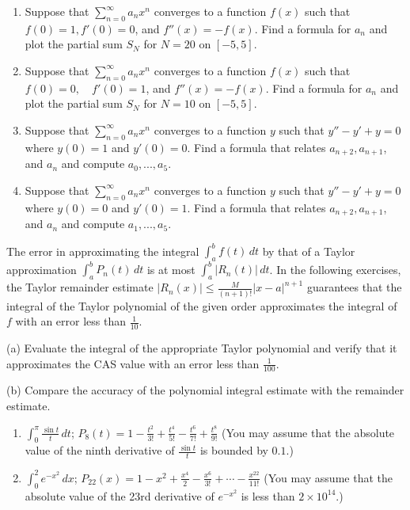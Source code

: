\documentclass{exercises}
\begin{document}
\begin{enumerate}[resume]
\item \techrequired Suppose that $\sum_{n=0}^{\infty}a_{n}x^{n}$ converges to a function $f(x)$ such that $f(0)=1,f'(0)=0$, and $f''(x)=-f(x)$. Find a formula for $a_{n}$ and plot the partial sum $S_{N}$ for $N=20$ on $[-5,5]$.
\item \techrequired Suppose that $\sum_{n=0}^{\infty}a_{n}x^{n}$ converges to a function $f(x)$ such that $f(0)=0,\quad f'(0)=1$, and $f''(x)=-f(x)$. Find a formula for $a_{n}$ and plot the partial sum $S_{N}$ for $N=10$ on $[-5,5]$.
\item Suppose that $\sum_{n=0}^{\infty}a_{n}x^{n}$ converges to a function $y$ such that $y''-y'+y=0$ where $y(0)=1$ and $y'(0)=0$. Find a formula that relates $a_{n+2},a_{n+1}$, and $a_{n}$ and compute $a_{0},...,a_{5}$.
\item Suppose that $\sum_{n=0}^{\infty}a_{n}x^{n}$ converges to a function $y$ such that $y''-y'+y=0$ where $y(0)=0$ and $y'(0)=1$. Find a formula that relates $a_{n+2},a_{n+1}$, and $a_{n}$ and compute $a_{1},...,a_{5}$.
\end{enumerate}

The error in approximating the integral $\int_{a}^{b}f(t)\,dt$ by that of a Taylor approximation $\int_{a}^{b}P_{n}(t)\,dt$ is at most $\int_{a}^{b}|R_{n}(t)|\,dt$. In the following exercises, the Taylor remainder estimate $|R_{n}(x)|\le \frac{M}{(n+1)!}{|x-a|}^{n+1}$ guarantees that the integral of the Taylor polynomial of the given order approximates the integral of $f$ with an error less than $\frac{1}{10}$.


(a) Evaluate the integral of the appropriate Taylor polynomial and verify that it approximates the CAS value with an error less than $\frac{1}{100}$.


(b) Compare the accuracy of the polynomial integral estimate with the remainder estimate.

\begin{enumerate}[resume]
\item \techrequired $\int_{0}^{\pi}\frac{\sin t}{t}\,dt$; $P_{8}(t)=1-\frac{t^{2}}{3!}+\frac{t^{4}}{5!}-\frac{t^{6}}{7!}+\frac{t^{8}}{9!}$ (You may assume that the absolute value of the ninth derivative of $\frac{\sin t}{t}$ is bounded by $0.1$.)
\item \techrequired $\int_{0}^{2}e^{-x^{2}}\,dx$; $P_{22}(x)=1-x^{2}+\frac{x^{4}}{2}-\frac{x^{6}}{3!}+\cdots-\frac{x^{22}}{11!}$ (You may assume that the absolute value of the 23rd derivative of $e^{-x^{2}}$ is less than $2\times 10^{14}$.)
\end{enumerate}
\end{document}
